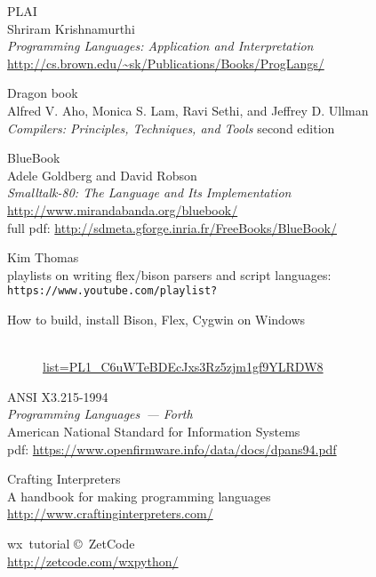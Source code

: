 \begin{thebibliography}{99}

 PLAI\\
Shriram Krishnamurthi\\
\emph{Programming Languages: Application and Interpretation}\\
\url{http://cs.brown.edu/~sk/Publications/Books/ProgLangs/}

 Dragon book\\
Alfred V. Aho, Monica S. Lam, Ravi Sethi, and Jeffrey D. Ullman\\
\emph{Compilers: Principles, Techniques, and Tools} second edition

 BlueBook\\
Adele Goldberg and David Robson\\
\emph{Smalltalk-80: The Language and Its Implementation}\\
\url{http://www.mirandabanda.org/bluebook/}\\
full pdf: \url{http://sdmeta.gforge.inria.fr/FreeBooks/BlueBook/}

Kim Thomas\\playlists on writing flex/bison parsers and script languages:\\
\verb|https://www.youtube.com/playlist?|\\
\begin{description}
\item[How to build, install Bison, Flex, Cygwin on Windows]\ \\
\href{https://www.youtube.com/playlist?list=PL1\_C6uWTeBDEcJxs3Rz5zjm1gf9YLRDW8}{list=PL1\_C6uWTeBDEcJxs3Rz5zjm1gf9YLRDW8}
\item[]
\end{description}

 ANSI X3.215-1994\\
\emph{Programming Languages\ --- Forth}\\
American National Standard for Information Systems\\
pdf: \url{https://www.openfirmware.info/data/docs/dpans94.pdf}

 Crafting Interpreters\\
A handbook for making programming languages\\
\url{http://www.craftinginterpreters.com/}

 wx\py\ tutorial \copyright\ ZetCode\\
	\url{http://zetcode.com/wxpython/}

\end{thebibliography}
